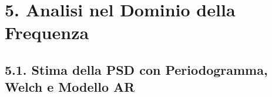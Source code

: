 \documentclass[11pt]{article}
\begin{document}
    \begin{center}
    \end{center}
    { \hspace*{\fill} \\}
    
    \section{5. Analisi nel Dominio della
Frequenza}\label{analisi-nel-dominio-della-frequenza}

    \subsection{5.1. Stima della PSD con Periodogramma, Welch e Modello
AR}\label{stima-della-psd-con-periodogramma-welch-e-modello-ar}
\end{document}
